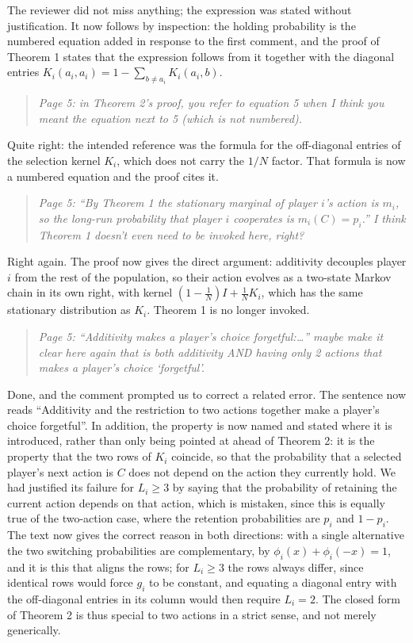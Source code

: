 \documentclass[11pt]{article}
\newenvironment{reviewerquote}
  {\begin{quote}\itshape}
  {\end{quote}}
\begin{document}
The reviewer did not miss anything; the expression was stated without
justification. It now follows by inspection: the holding probability is
the numbered equation added in response to the first comment, and the
proof of Theorem 1 states that the expression follows from it together
with the diagonal entries
\(K_i(a_i,a_i)=1-\sum_{b\neq a_i}K_i(a_i,b)\).

\begin{reviewerquote}
Page 5: in Theorem 2's proof, you refer to equation 5 when I think you
meant the equation next to 5 (which is not numbered).
\end{reviewerquote}

Quite right: the intended reference was the formula for the off-diagonal
entries of the selection kernel \(K_i\), which does not carry the
\(1/N\) factor. That formula is now a numbered equation and the proof
cites it.

\begin{reviewerquote}
Page 5: ``By Theorem 1 the stationary marginal of player \(i\)'s action
is \(m_i\), so the long-run probability that player \(i\) cooperates is
\(m_i(C) = p_i\).'' I think Theorem 1 doesn't even need to be invoked
here, right?
\end{reviewerquote}

Right again. The proof now gives the direct argument: additivity
decouples player \(i\) from the rest of the population, so their action
evolves as a two-state Markov chain in its own right, with kernel
\((1-\tfrac{1}{N})I+\tfrac{1}{N}K_i\), which has the same stationary
distribution as \(K_i\). Theorem 1 is no longer invoked.

\begin{reviewerquote}
Page 5: ``Additivity makes a player's choice forgetful:\ldots'' maybe
make it clear here again that is both additivity AND having only 2
actions that makes a player's choice `forgetful'.
\end{reviewerquote}

Done, and the comment prompted us to correct a related error. The sentence
now reads ``Additivity and the restriction to two actions together make a
player's choice forgetful''. In addition, the property is now named and
stated where it is introduced, rather than only being pointed at ahead of
Theorem 2: it is the property that the two rows of \(K_i\) coincide, so
that the probability that a selected player's next action is \(C\) does
not depend on the action they currently hold. We had justified its failure
for \(L_i\ge3\) by saying that the probability of retaining the current
action depends on that action, which is mistaken, since this is equally
true of the two-action case, where the retention probabilities are
\(p_i\) and \(1-p_i\). The text now gives the correct reason in both
directions: with a single alternative the two switching probabilities are
complementary, by \(\phi_i(x)+\phi_i(-x)=1\), and it is this that aligns
the rows; for \(L_i\ge3\) the rows always differ, since identical rows
would force \(g_i\) to be constant, and equating a diagonal entry with the
off-diagonal entries in its column would then require \(L_i=2\). The
closed form of Theorem 2 is thus special to two actions in a strict
sense, and not merely generically.
\end{document}
